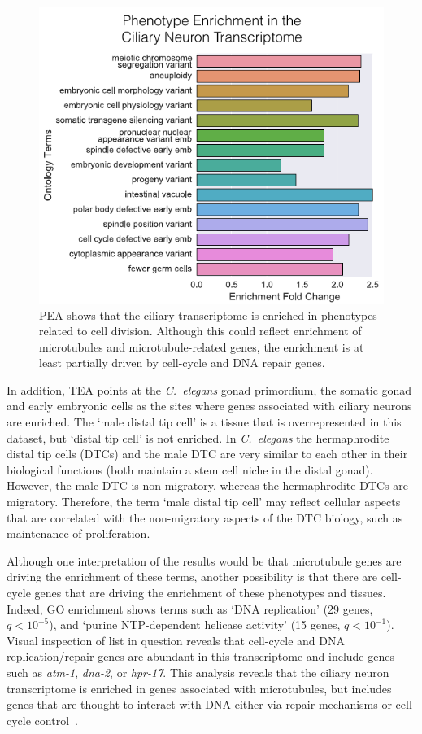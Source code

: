 \documentclass[10pt,letterpaper,twocolumn]{article}
\newcommand{\cel}{\emph{C.~elegans}}
\newcommand{\qval}[1]{\ensuremath{q<10^{-#1}}}
\begin{document}
\begin{figure}[htbp]
  \renewcommand{\familydefault}{\sfdefault}\normalfont{}
  \centering
  \includegraphics[width=\linewidth]{ciliary-transcriptome.pdf}
  \caption{PEA shows that the ciliary transcriptome is enriched in phenotypes
  related to cell division. Although this could reflect enrichment of
  microtubules and microtubule-related genes, the enrichment is at least
  partially driven by cell-cycle and DNA repair genes.}
\label{fig:cilia}
\end{figure}


In addition, TEA points at the \cel{} gonad primordium, the somatic gonad
and early embryonic cells as the sites where genes associated with ciliary neurons
are enriched. The `male distal tip cell' is a tissue
that is overrepresented in this dataset, but `distal tip cell' is not enriched.
In \cel{} the hermaphrodite distal tip cells (DTCs) and the male DTC are very
similar to each other in their biological functions (both maintain a stem cell
niche in the distal gonad). However, the male DTC is non-migratory, whereas the
hermaphrodite DTCs are migratory. Therefore, the term `male distal tip cell'
may reflect cellular aspects that are correlated with the non-migratory aspects
of the DTC biology, such as maintenance of proliferation.

Although one interpretation of the results would be that microtubule genes
are driving the enrichment of these terms, another possibility is that
there are cell-cycle genes that are driving the enrichment of these phenotypes
and tissues. Indeed, GO enrichment shows terms such as `DNA replication' (29
genes, \qval{5}), and `purine NTP-dependent helicase activity'
(15 genes, \qval{1}). Visual inspection of list in question reveals that
cell-cycle and DNA replication/repair genes are abundant in this transcriptome
and include genes such as \emph{atm-1}, \emph{dna-2}, or \emph{hpr-17}. This
analysis reveals that the ciliary neuron transcriptome is enriched in
genes associated with microtubules, but includes genes that are thought to
interact with DNA either via repair mechanisms or cell-cycle
control~\cite{Hofmann2000,Lee2003a,Bailly2010}.
\end{document}

